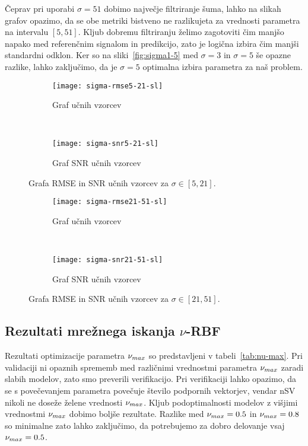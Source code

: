 Čeprav pri uporabi $\sigma=51$ dobimo največje filtriranje šuma, lahko na slikah grafov opazimo, da se obe metriki bistveno ne razlikujeta za vrednosti parametra na intervalu $[5,51]$. Kljub dobremu filtriranju želimo zagotoviti čim manjšo napako med referenčnim signalom in predikcijo, zato je logična izbira čim manjši standardni odklon. Ker so na sliki~\ref{fig:sigma1-5} med $\sigma=3$ in $\sigma=5$ še opazne razlike, lahko zaključimo, da je $\sigma=5$ optimalna izbira parametra za naš problem. 


\begin{figure}[!htb]
	\centering
	\begin{subfigure}[t]{0.45\columnwidth}
		\texttt{[image: sigma-rmse5-21-sl]}
		\caption{Graf \rmse  učnih vzorcev}
		\label{fig:sigma-rmse5-21}
	\end{subfigure}
	~
	\begin{subfigure}[t]{0.45\columnwidth}
		\texttt{[image: sigma-snr5-21-sl]}
		\caption{Graf SNR  učnih vzorcev}
		\label{fig:sigma-snr5-21}
	\end{subfigure}
	\caption[Grafa \rmse in SNR učnih vzorcev za \mbox{$\sigma \in [5,21]$}]{Grafa RMSE in SNR učnih vzorcev za \mbox{$\sigma \in [5,21]$}.}
	\label{fig:sigma5-21}
\end{figure}



\begin{figure}[!htb]
	\centering
	\begin{subfigure}[t]{0.45\columnwidth}
		\texttt{[image: sigma-rmse21-51-sl]}
		\caption{Graf \rmse učnih vzorcev}
		\label{fig:sigma-rmse21-51}
	\end{subfigure}
	~
	\begin{subfigure}[t]{0.45\columnwidth}
		\texttt{[image: sigma-snr21-51-sl]}
		\caption{Graf SNR  učnih vzorcev}
		\label{fig:sigma-snr21-51}
	\end{subfigure}
	\caption[Grafa \rmse in SNR učnih vzorcev za \mbox{$\sigma \in [21,51]$}]{Grafa RMSE in SNR učnih vzorcev za \mbox{$\sigma \in [21,51]$}.}
	\label{fig:sigma21-51}
\end{figure}


\subsection{Rezultati mrežnega iskanja \texorpdfstring{$\nu$}{nu}-RBF}
Rezultati optimizacije parametra $\nu_{max}$ so predstavljeni v tabeli~\ref{tab:nu-max}. Pri validaciji ni opaznih sprememb med različnimi vrednostmi parametra $\nu_{max}$ zaradi slabih modelov, zato smo preverili verifikacijo. Pri verifikaciji lahko opazimo, da se s povečevanjem parametra povečuje število podpornih vektorjev, vendar nSV nikoli ne doseže želene vrednosti $\nu_{max}$. Kljub podoptimalnosti modelov z višjimi vrednostmi $\nu_{max}$ dobimo boljše rezultate. Razlike med $\nu_{max}=\num{0.5}$ in $\nu_{max}=\num{0.8}$ so minimalne zato lahko zaključimo, da potrebujemo za dobro delovanje vsaj $\nu_{max}=\num{0.5}$. 

